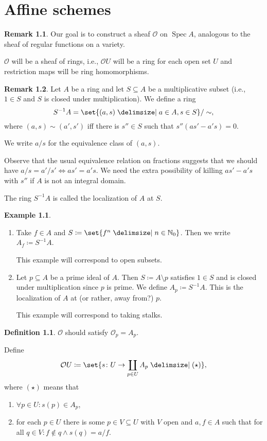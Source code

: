 \documentclass[a4paper]{amsbook}
\theoremstyle{definition}
\newtheorem*{definition*}{Definition}
\newtheorem*{remark*}{Remark}
\newtheorem*{example*}{Example}
\DeclareMathOperator\Spec{Spec}
\begin{document}
\chapter{Affine schemes}
\label{AffineSchemes}
\begin{remark*}
\label{Goal}
Our goal is to construct a sheaf $\mathcal{O}$ on $\Spec A$, analogous to the sheaf of
regular functions on a variety.

$\mathcal{O}$ will be a sheaf of rings, i.e., $\mathcal{O}U$ will be a ring for each
open set $U$ and restriction maps will be ring homomorphisms.
\end{remark*}

\begin{remark*}
\label{Localization}
Let $A$ be a ring and let $S \subseteq A$ be a multiplicative subset (i.e., $1 \in S$ and
$S$ is closed under multiplication). We define a ring
\[ S^{-1}A = \set{(a, s)\given a \in A, s \in S}/\sim, \]
where $(a, s) \sim (a', s')$ iff there is $s'' \in S$ such that
$s''(as'-a's) = 0$.

We write $a/s$ for the equivalence class of $(a, s)$.

Observe that the usual equivalence relation on fractions suggests that we should
have $a/s = a'/s' \iff as' = a's$. We need the extra possibility of killing
$as'-a's$ with $s''$ if $A$ is not an integral domain.

The ring $S^{-1}A$ is called the localization of $A$ at $S$.
\end{remark*}

\begin{example*}
\label{LocalizationExample}
\begin{enumerate}
	\item Take $f \in A$ and $S\coloneqq \set{f^n\given n \in \mathbb{N}_0}$. Then we write
		$A_f\coloneqq S^{-1}A$.

		This example will correspond to open subsets.
	\item Let $p \subseteq A$ be a prime ideal of $A$. Then $S\coloneqq A\setminus p$
		satisfies $1 \in S$ and is closed under multiplication since  $p$ is
		prime. We define $A_p\coloneqq S^{-1}A$. This is the localization of $A$
		at (or rather, away from?) $p$.

		This example will correspond to taking stalks.
\end{enumerate}
\end{example*}

\begin{definition*}
\label{StructureSheaf}
$\mathcal{O}$ should satisfy $\mathcal{O}_p = A_p$.

Define
\[ \mathcal{O}U \coloneqq\set{s\colon U\to\coprod_{p \in U} A_p\given (\star)}, \]
where $(\star)$ means that
\begin{enumerate}
	\item $\forall p \in U\colon s(p) \in A_p$,
	\item for each $p \in U$ there is some $p \in V \subseteq U$ with $V$ open and
		$a, f \in A$ such that for all $q \in V\colon f\notin q\wedge s(q) = a/f$.
\end{enumerate}
\end{definition*}
\end{document}
